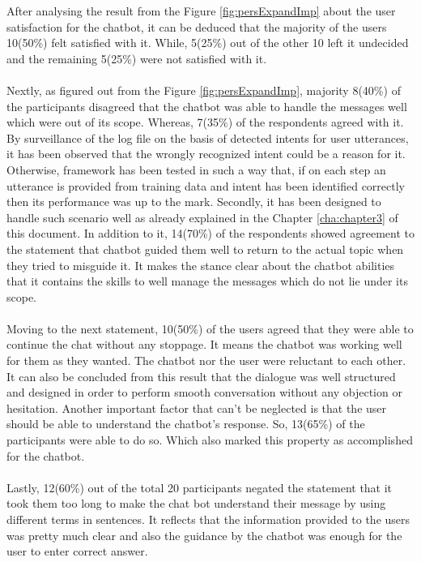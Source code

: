 After analysing the result from the Figure \ref{fig:persExpandImp} about the user satisfaction for the chatbot, it can be deduced that the majority of the users 10(50\%) felt satisfied with it. While, 5(25\%) out of the other 10 left it undecided and the remaining 5(25\%) were not satisfied with it.
\\~\\
Nextly, as figured out from the Figure \ref{fig:persExpandImp}, majority 8(40\%) of the participants disagreed that the chatbot was able to handle the messages well which were out of its scope. Whereas, 7(35\%) of the respondents agreed with it. By surveillance of the log file on the basis of detected intents for user utterances, it has been observed that the wrongly recognized intent could be a reason for it. Otherwise, framework has been tested in such a way that, if on each step an utterance is provided from training data and intent has been identified correctly then its performance was up to the mark. Secondly, it has been designed to handle such scenario well as already explained in the Chapter \ref{cha:chapter3} of this document. In addition to it, 14(70\%) of the respondents showed agreement to the statement that chatbot guided them well to return to the actual topic when they tried to misguide it. It makes the stance clear about the chatbot abilities that it contains the skills to well manage the messages which do not lie under its scope.
\\~\\
Moving to the next statement, 10(50\%) of the users agreed that they were able to continue the chat without any stoppage. It means the chatbot was working well for them as they wanted. The chatbot nor the user were reluctant to each other. It can also be concluded from this result that the dialogue was well structured and designed in order to perform smooth conversation without any objection or hesitation. Another important factor that can't be neglected is that the user should be able to understand the chatbot's response. So, 13(65\%) of the participants were able to do so. Which also marked this property as accomplished for the chatbot.
\\~\\
Lastly, 12(60\%) out of the total 20 participants negated the statement that it took them too long to make the chat bot understand their message by using different terms in sentences. It reflects that the information provided to the users was pretty much clear and also the guidance by the chatbot was enough for the user to enter correct answer.

